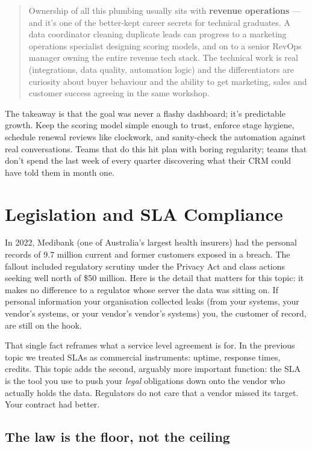 \begin{quote}\small
Ownership of all this plumbing usually sits with \textbf{revenue operations} — and it's one of the better-kept career secrets for technical graduates. A data coordinator cleaning duplicate leads can progress to a marketing operations specialist designing scoring models, and on to a senior RevOps manager owning the entire revenue tech stack. The technical work is real (integrations, data quality, automation logic) and the differentiators are curiosity about buyer behaviour and the ability to get marketing, sales and customer success agreeing in the same workshop.
\end{quote}


The takeaway is that the goal was never a flashy dashboard; it's predictable growth. Keep the scoring model simple enough to trust, enforce stage hygiene, schedule renewal reviews like clockwork, and sanity-check the automation against real conversations. Teams that do this hit plan with boring regularity; teams that don't spend the last week of every quarter discovering what their CRM could have told them in month one.

\section{Legislation and SLA Compliance}
In 2022, Medibank (one of Australia's largest health insurers) had the personal records of 9.7 million current and former customers exposed in a breach. The fallout included regulatory scrutiny under the Privacy Act and class actions seeking well north of \$50 million. Here is the detail that matters for this topic: it makes no difference to a regulator whose server the data was sitting on. If personal information your organisation collected leaks (from your systems, your vendor's systems, or your vendor's vendor's systems) you, the customer of record, are still on the hook.


That single fact reframes what a service level agreement is for. In the previous topic we treated SLAs as commercial instruments: uptime, response times, credits. This topic adds the second, arguably more important function: the SLA is the tool you use to push your \emph{legal} obligations down onto the vendor who actually holds the data. Regulators do not care that a vendor missed its target. Your contract had better.



\subsection{The law is the floor, not the ceiling}


